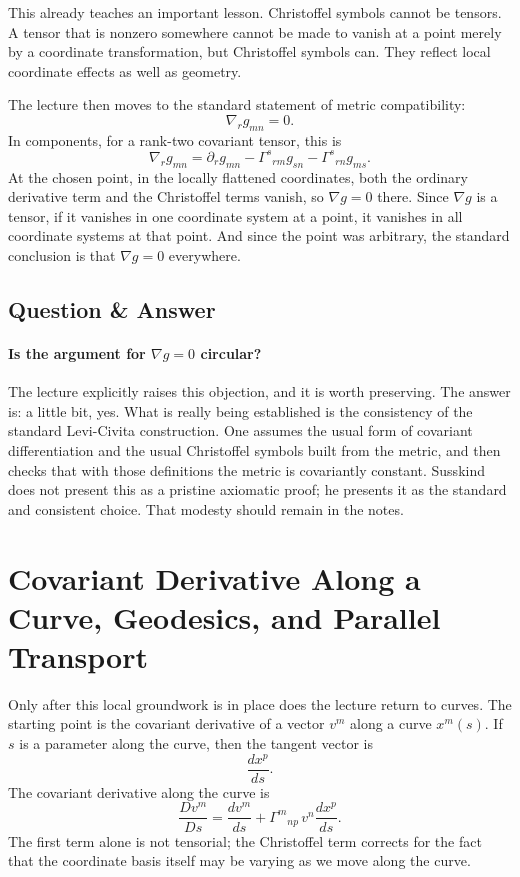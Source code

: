 This already teaches an important lesson. Christoffel symbols cannot be tensors. A tensor that is nonzero somewhere cannot be made to vanish at a point merely by a coordinate transformation, but Christoffel symbols can. They reflect local coordinate effects as well as geometry.

The lecture then moves to the standard statement of metric compatibility:
\begin{equation}
\nabla_{r}g_{mn}=0.
\end{equation}
In components, for a rank-two covariant tensor, this is
\begin{equation}
\nabla_{r}g_{mn}
=
\partial_{r}g_{mn}
-\Gamma^{s}{}_{rm}g_{sn}
-\Gamma^{s}{}_{rn}g_{ms}.
\end{equation}
At the chosen point, in the locally flattened coordinates, both the ordinary derivative term and the Christoffel terms vanish, so \(\nabla g=0\) there. Since \(\nabla g\) is a tensor, if it vanishes in one coordinate system at a point, it vanishes in all coordinate systems at that point. And since the point was arbitrary, the standard conclusion is that \(\nabla g=0\) everywhere.

\subsection{Question \& Answer}

\paragraph{Is the argument for \(\nabla g=0\) circular?}

The lecture explicitly raises this objection, and it is worth preserving. The answer is: a little bit, yes. What is really being established is the consistency of the standard Levi-Civita construction. One assumes the usual form of covariant differentiation and the usual Christoffel symbols built from the metric, and then checks that with those definitions the metric is covariantly constant. Susskind does not present this as a pristine axiomatic proof; he presents it as the standard and consistent choice. That modesty should remain in the notes.

\section{Covariant Derivative Along a Curve, Geodesics, and Parallel Transport}

Only after this local groundwork is in place does the lecture return to curves. The starting point is the covariant derivative of a vector \(v^{m}\) along a curve \(x^{m}(s)\). If \(s\) is a parameter along the curve, then the tangent vector is
\[
\frac{dx^{p}}{ds}.
\]
The covariant derivative along the curve is
\begin{equation}
\frac{D v^{m}}{Ds}
=
\frac{dv^{m}}{ds}
+
\Gamma^{m}{}_{np}\,v^{n}\frac{dx^{p}}{ds}.
\end{equation}
The first term alone is not tensorial; the Christoffel term corrects for the fact that the coordinate basis itself may be varying as we move along the curve.

